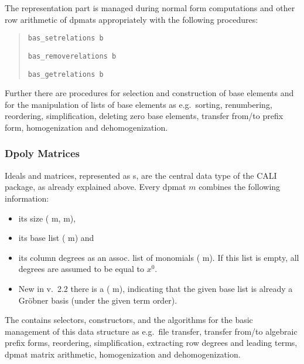 The representation part is managed during normal form computations
and other row arithmetic of dpmats appropriately with the following
procedures:
\begin{quote}
\verb|bas_setrelations b|


\verb|bas_removerelations b|


\verb|bas_getrelations b|

\end{quote}

Further there are procedures for selection and construction of base
elements and for the manipulation of lists of base elements as e.g.\
sorting, renumbering, reordering, simplification, deleting zero base
elements, transfer from/to prefix form, homogenization and dehomogenization.

\subsubsection{Dpoly Matrices}

Ideals and matrices, represented as s, are the central
data type of the CALI package, as already explained above. Every
dpmat $m$ combines the following information:
\begin{itemize}
\item its size ( m, m),

\item its base list ( m) and

\item its column degrees as an assoc. list of monomials
( m). If this list is empty, all degrees are
assumed to be equal to $x^0$.

\item New in v.\ 2.2 there is a  ( m),
indicating that the given base list is already a Gr\"obner basis (under the
given term order).
\end{itemize}

The  contains selectors, constructors, and the
algorithms for the basic management of this data structure as e.g.\
file transfer, transfer from/to algebraic prefix forms, reordering,
simplification, extracting row degrees and leading terms, dpmat matrix
arithmetic, homogenization and dehomogenization.

